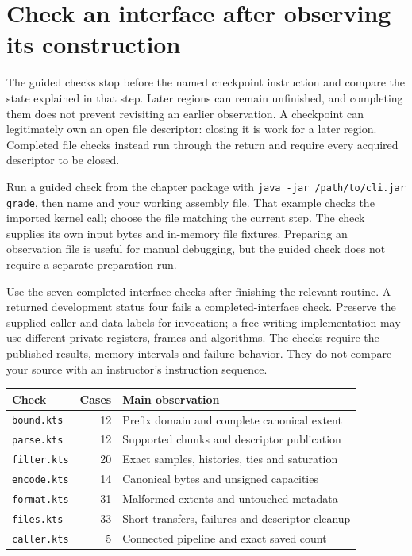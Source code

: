 \section{Check an interface after observing its construction}
The guided checks stop before the named checkpoint instruction and compare the state
explained in that step. Later regions can remain unfinished, and completing them does
not prevent revisiting an earlier observation. A checkpoint can legitimately own an
open file descriptor: closing it is work for a later region. Completed file checks
instead run through the return and require every acquired descriptor to be closed.

Run a guided check from the chapter package with
\texttt{java -jar /path/to/cli.jar grade}, then name
 and your working assembly file. That example checks
the imported kernel call; choose the file matching the current step. The check supplies
its own input bytes and in-memory file fixtures. Preparing an observation file is useful
for manual debugging, but the guided check does not require a separate preparation run.

Use the seven completed-interface checks after finishing the relevant routine. A
returned development status four fails a completed-interface check. Preserve the
supplied caller and data labels for invocation; a free-writing implementation may use
different private registers, frames and algorithms. The checks require the published
results, memory intervals and failure behavior. They do not compare your source with
an instructor's instruction sequence.

\begin{center}
  \begin{tabular}{lrl}
    Check               & Cases & Main observation                                 \\
    \hline
    \texttt{bound.kts}  & 12    & Prefix domain and complete canonical extent      \\
    \texttt{parse.kts}  & 12    & Supported chunks and descriptor publication      \\
    \texttt{filter.kts} & 20    & Exact samples, histories, ties and saturation    \\
    \texttt{encode.kts} & 14    & Canonical bytes and unsigned capacities          \\
    \texttt{format.kts} & 31    & Malformed extents and untouched metadata         \\
    \texttt{files.kts}  & 33    & Short transfers, failures and descriptor cleanup \\
    \texttt{caller.kts} & 5     & Connected pipeline and exact saved count         \\
  \end{tabular}
\end{center}

